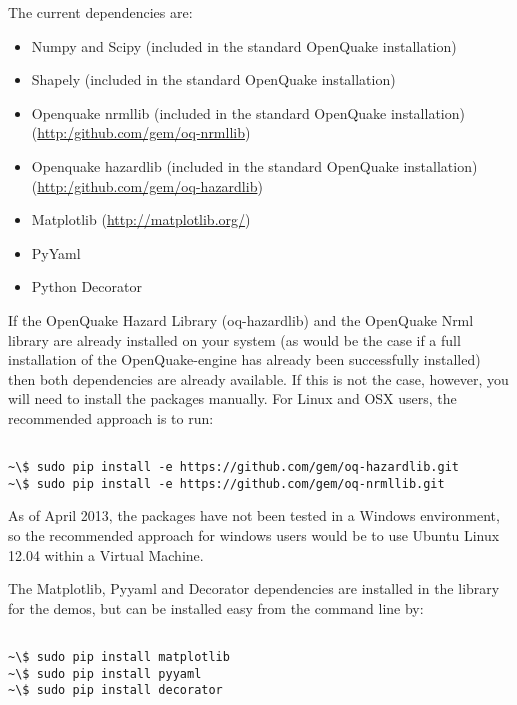 The current dependencies are:
\begin{itemize}
\item Numpy and Scipy (included in the standard OpenQuake installation)
\item Shapely (included in the standard OpenQuake installation)
\item Openquake nrmllib (included in the standard OpenQuake installation) 
    \hfill \\ (\href{http:/github.com/gem/oq-nrmllib}{http:/github.com/gem/oq-nrmllib}) 
\item Openquake hazardlib (included in the standard OpenQuake installation) 
    \hfill \\ (\href{http:/github.com/gem/oq-hazardlib}{http:/github.com/gem/oq-hazardlib})
\item Matplotlib (\href{http://matplotlib.org/}{http://matplotlib.org/})
\item PyYaml
\item Python Decorator
\end{itemize}

If the OpenQuake Hazard Library (oq-hazardlib) and the OpenQuake Nrml library are already installed on your system (as would be the case if a full installation of the OpenQuake-engine has already been successfully installed) then both dependencies are already available. If this is not the case, however, you will need to install the packages manually. For Linux and OSX users, the recommended approach is to run:

\begin{Verbatim}[frame=single, commandchars=\\\{\}, fontsize=\scriptsize]

~\$ sudo pip install -e https://github.com/gem/oq-hazardlib.git
~\$ sudo pip install -e https://github.com/gem/oq-nrmllib.git

\end{Verbatim}

As of April 2013, the packages have not been tested in a Windows environment, so the recommended approach for windows users would be to use Ubuntu Linux 12.04 within a Virtual Machine.

The Matplotlib, Pyyaml and Decorator dependencies are installed in the library for the demos, but can be installed easy from the command line by:

\begin{Verbatim}[frame=single, commandchars=\\\{\}, fontsize=\scriptsize]

~\$ sudo pip install matplotlib
~\$ sudo pip install pyyaml
~\$ sudo pip install decorator

\end{Verbatim}

